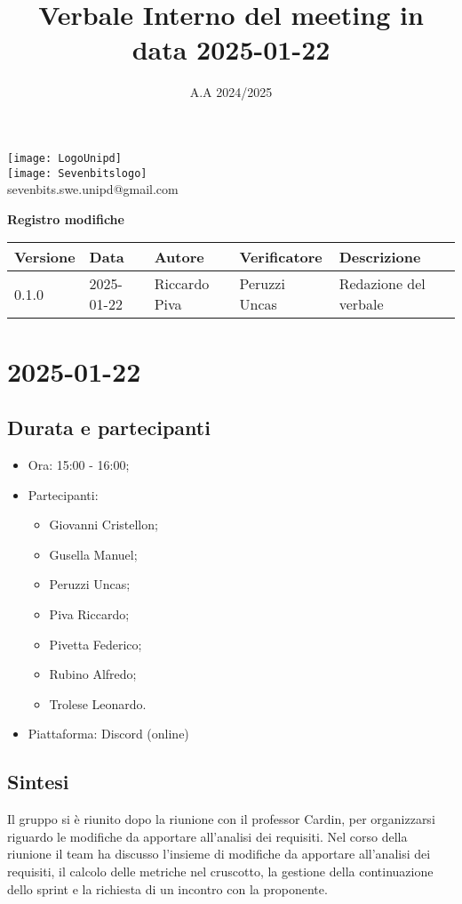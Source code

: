 \documentclass[10pt]{article}
\title{Verbale Interno del meeting in data 2025-01-22}
\date{A.A 2024/2025}
\begin{document}
\maketitle
\begin{center}
\texttt{[image: LogoUnipd]}\\
\texttt{[image: Sevenbitslogo]}\\
sevenbits.swe.unipd@gmail.com\\
\vspace{2mm}

\textbf{Registro modifiche}\\
\vspace{2mm}
\begin{tabularx}{\textwidth}{|l|l|l|l|X|}
\hline
\textbf{Versione} & \textbf{Data} & \textbf{Autore} & \textbf{Verificatore} & \textbf{Descrizione} \\
\hline
0.1.0 & 2025-01-22 & Riccardo Piva & Peruzzi Uncas & Redazione del verbale \\
\hline
\end{tabularx}
\end{center}

\newpage
\tableofcontents
\newpage
\section{2025-01-22}
\subsection{Durata e partecipanti}
\begin{itemize}
\item Ora: 15:00 - 16:00;
\item Partecipanti:
	\begin{itemize}
    	\item Giovanni Cristellon;
		\item Gusella Manuel;
		\item Peruzzi Uncas;
		\item Piva Riccardo;
		\item Pivetta Federico;
		\item Rubino Alfredo;
		\item Trolese Leonardo.
	\end{itemize}
\item Piattaforma: Discord (online)
\end{itemize}

\subsection{Sintesi}
Il gruppo si è riunito dopo la riunione con il professor Cardin, per organizzarsi riguardo le modifiche da apportare all'analisi dei requisiti.
Nel corso della riunione il team ha discusso l'insieme di modifiche da apportare all'analisi dei requisiti, il calcolo delle metriche nel cruscotto, la gestione della continuazione dello sprint e la richiesta di un incontro con la proponente.
\end{document}
